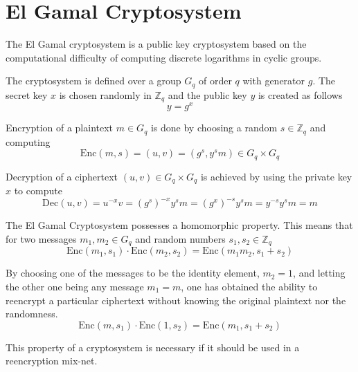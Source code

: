 \documentclass[18pt,a4paper]{article}
\begin{document}
\section*{El Gamal Cryptosystem}
The El Gamal cryptosystem is a public key cryptosystem based on the
computational difficulty of computing discrete logarithms in cyclic
groups. 

The cryptosystem is defined over a group $G_q$ of order $q$ with
generator $g$. The secret key $x$ is chosen randomly in $\mathbb{Z}_q$
and the public key $y$ is created as follows
$$
y = g^x
$$

Encryption of a plaintext $m \in G_q$ is done by choosing a random $s
\in \mathbb{Z}_q$ and computing
$$
\mathrm{Enc}(m,s) = (u,v) = (g^s, y^sm) \in G_q \times G_q
$$

Decryption of a ciphertext $(u,v) \in G_q \times G_q$ is achieved by
using the private key $x$ to compute
$$ 
\mathrm{Dec}(u,v) = u^{-x}v = (g^s)^{-x}y^sm = (g^x)^{-s}y^sm = y^{-s}y^sm = m
$$

The El Gamal Cryptosystem possesses a homomorphic property. This means
that for two messages $m_1,m_2 \in G_q$ and random numbers $s_1, s_2
\in \mathbb{Z}_q$
$$
\mathrm{Enc}(m_1,s_1) \cdot \mathrm{Enc}(m_2,s_2) = \mathrm{Enc}(m_1m_2,s_1 + s_2)
$$

By choosing one of the messages to be the identity element, $m_2 = 1$,
and letting the other one being any message $m_1 = m$, one has
obtained the ability to reencrypt a particular ciphertext without
knowing the original plaintext nor the randomness. 
$$
\mathrm{Enc}(m,s_1) \cdot \mathrm{Enc}(1,s_2) = \mathrm{Enc}(m_1, s_1 + s_2)
$$

This property of a cryptosystem is necessary if it should be used in a
reencryption mix-net.
\end{document}
